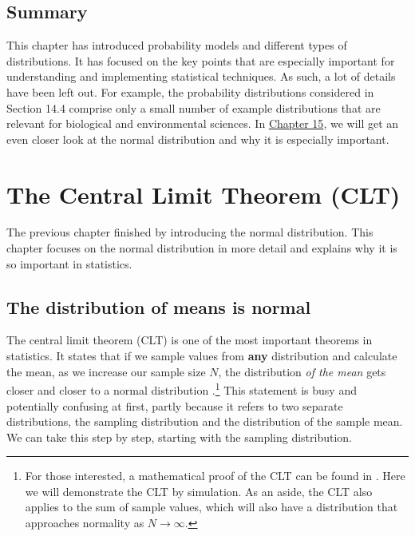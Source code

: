 \documentclass[
]{scrbook}
\begin{document}
\hypertarget{summary-2}{%
\section{Summary}\label{summary-2}}

This chapter has introduced probability models and different types of distributions.
It has focused on the key points that are especially important for understanding and implementing statistical techniques.
As such, a lot of details have been left out.
For example, the probability distributions considered in Section 14.4 comprise only a small number of example distributions that are relevant for biological and environmental sciences.
In \protect\hyperlink{Chapter_15}{Chapter 15}, we will get an even closer look at the normal distribution and why it is especially important.

\hypertarget{Chapter_15}{%
\chapter{The Central Limit Theorem (CLT)}\label{Chapter_15}}

The previous chapter finished by introducing the normal distribution.
This chapter focuses on the normal distribution in more detail and explains why it is so important in statistics.

\hypertarget{the-distribution-of-means-is-normal}{%
\section{The distribution of means is normal}\label{the-distribution-of-means-is-normal}}

The central limit theorem (CLT) is one of the most important theorems in statistics.
It states that if we sample values from \textbf{any} distribution and calculate the mean, as we increase our sample size \(N\), the distribution \emph{of the mean} gets closer and closer to a normal distribution \citep{Sokal1995, Miller2004, Spiegelhalter2019}.\footnote{For those interested, a mathematical proof of the CLT can be found in \citet{Miller2004}. Here we will demonstrate the CLT by simulation. As an aside, the CLT also applies to the sum of sample values, which will also have a distribution that approaches normality as \(N \to \infty\).}
This statement is busy and potentially confusing at first, partly because it refers to two separate distributions, the sampling distribution and the distribution of the sample mean.
We can take this step by step, starting with the sampling distribution.
\end{document}
